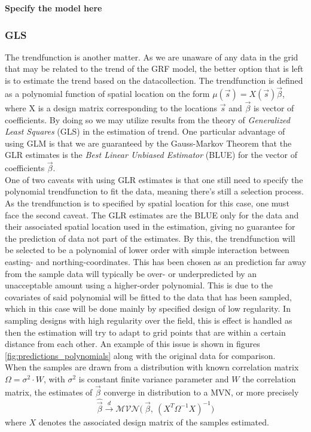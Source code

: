 \textbf{Specify the model here}

\subsubsection{GLS}
The trendfunction is another matter. As we are unaware of any data in the grid that may be related to the trend of the GRF model, the better option that is left is to estimate the trend based on the datacollection. The trendfunction is defined as a polynomial function of spatial location on the form $\mu(\vec{s}) = X(\vec{s})\vec{\beta}$, where X is a design matrix corresponding to the locations $\vec{s}$ and $\vec{\beta}$ is vector of coefficients. By doing so we may utilize results from the theory of \textit{Generalized Least Squares} (GLS) in the estimation of trend. One particular advantage of using GLM is that we are guaranteed by the Gauss-Markov Theorem that the GLR estimates is the \textit{Best Linear Unbiased Estimator} (BLUE) for the vector of coefficients $\vec{\beta}$. \\

One of two caveats with using GLR estimates is that one still need to specify the polynomial trendfunction to fit the data, meaning there's still a selection process. As the trendfunction is to specified by spatial location for this case, one must face the second caveat. The GLR estimates are the BLUE only for the data and their associated spatial location used in the estimation, giving no guarantee for the prediction of data not part of the estimates. By this, the trendfunction will be selected to be a polynomial of lower order with simple interaction between easting- and northing-coordinates. This has been chosen as an prediction far away from the sample data will typically be over- or underpredicted by an unacceptable amount using a higher-order polynomial. This is due to the covariates of said polynomial will be fitted to the data that has been sampled, which in this case will be done mainly by specified design of low regularity. In sampling designs with high regularity over the field, this is effect is handled as then the estimation will try to adapt to grid points that are within a certain distance from each other. An example of this issue is shown in figures \ref{fig:predictions_polynomials} along with the original data for comparison.  \\

When the samples are drawn from a distribution with known correlation matrix $\Omega = \sigma^2 \cdot W$, with $\sigma^2$ is constant finite variance parameter and $W$ the correlation matrix, the estimates of $\vec{\beta}$ converge in distribution to a MVN, or more precisely
\begin{equation}
\hat{\vec{\beta}} \xrightarrow[]{d} \mathcal{MVN} \big( \ \vec{\beta}, \ (X^T \Omega^{-1} X)^{-1} \big)
\end{equation}
where $X$ denotes the associated design matrix of the samples estimated.


